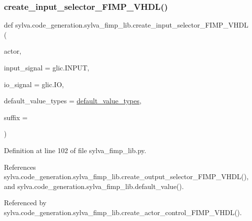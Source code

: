 \subsubsection{\texorpdfstring{create\+\_\+input\+\_\+selector\+\_\+\+F\+I\+M\+P\+\_\+\+V\+H\+D\+L()}{create\_input\_selector\_FIMP\_VHDL()}}
{\footnotesize\ttfamily def sylva.\+code\+\_\+generation.\+sylva\+\_\+fimp\+\_\+lib.\+create\+\_\+input\+\_\+selector\+\_\+\+F\+I\+M\+P\+\_\+\+V\+H\+DL (\begin{DoxyParamCaption}\item[{}]{actor,  }\item[{}]{input\+\_\+signal = {\ttfamily glic.INPUT},  }\item[{}]{io\+\_\+signal = {\ttfamily glic.IO},  }\item[{}]{default\+\_\+value\+\_\+types = {\ttfamily \hyperlink{namespacesylva_1_1code__generation_1_1sylva__fimp__lib_aa8422a786f50398770d5f045867640e4}{default\+\_\+value\+\_\+types}},  }\item[{}]{suffix = {\ttfamily \textquotesingle{}\textquotesingle{}} }\end{DoxyParamCaption})}



Definition at line 102 of file sylva\+\_\+fimp\+\_\+lib.\+py.



References sylva.\+code\+\_\+generation.\+sylva\+\_\+fimp\+\_\+lib.\+create\+\_\+output\+\_\+selector\+\_\+\+F\+I\+M\+P\+\_\+\+V\+H\+D\+L(), and sylva.\+code\+\_\+generation.\+sylva\+\_\+fimp\+\_\+lib.\+default\+\_\+value().



Referenced by sylva.\+code\+\_\+generation.\+sylva\+\_\+fimp\+\_\+lib.\+create\+\_\+actor\+\_\+control\+\_\+\+F\+I\+M\+P\+\_\+\+V\+H\+D\+L().



